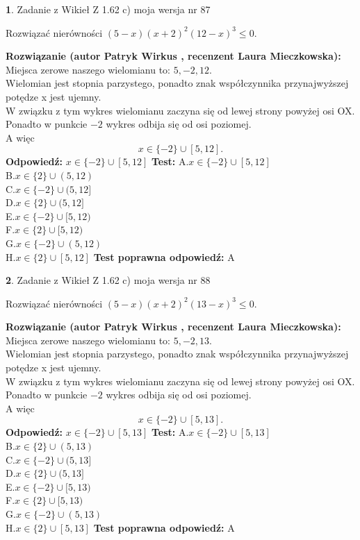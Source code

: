 \documentclass[12pt, a4paper]{article}
\theoremstyle{definition} %
\newtheorem{zad}{}
\newcommand{\zadStart}[1]{\begin{zad}#1\newline}
\newcommand{\zadStop}{\end{zad}}
\newcommand{\rozwStart}[2]{\noindent \textbf{Rozwiązanie (autor #1 , recenzent #2): }\newline}
\newcommand{\rozwStop}{\newline}
\newcommand{\odpStart}{\noindent \textbf{Odpowiedź:}\newline}
\newcommand{\odpStop}{\newline}
\newcommand{\testStart}{\noindent \textbf{Test:}\newline}
\newcommand{\testStop}{\newline}
\newcommand{\kluczStart}{\noindent \textbf{Test poprawna odpowiedź:}\newline}
\newcommand{\kluczStop}{\newline}
\begin{document}
\zadStart{Zadanie z Wikieł Z 1.62 c) moja wersja nr 87}

Rozwiązać nierówności $(5-x)(x+2)^{2}(12-x)^{3}\le0$.
\zadStop
\rozwStart{Patryk Wirkus}{Laura Mieczkowska}
Miejsca zerowe naszego wielomianu to: $5, -2, 12$.\\
Wielomian jest stopnia parzystego, ponadto znak współczynnika przy\linebreak najwyższej potędze x jest ujemny.\\ W związku z tym wykres wielomianu zaczyna się od lewej strony powyżej osi OX.\\
Ponadto w punkcie $-2$ wykres odbija się od osi poziomej.\\
A więc $$x \in \{-2\} \cup [5,12].$$
\rozwStop
\odpStart
$x \in \{-2\} \cup [5,12]$
\odpStop
\testStart
A.$x \in \{-2\} \cup [5,12]$\\
B.$x \in \{2\} \cup (5,12)$\\
C.$x \in \{-2\} \cup (5,12]$\\
D.$x \in \{2\} \cup (5,12]$\\
E.$x \in \{-2\} \cup [5,12)$\\
F.$x \in \{2\} \cup [5,12)$\\
G.$x \in \{-2\} \cup (5,12)$\\
H.$x \in \{2\} \cup [5,12]$
\testStop
\kluczStart
A
\kluczStop



\zadStart{Zadanie z Wikieł Z 1.62 c) moja wersja nr 88}

Rozwiązać nierówności $(5-x)(x+2)^{2}(13-x)^{3}\le0$.
\zadStop
\rozwStart{Patryk Wirkus}{Laura Mieczkowska}
Miejsca zerowe naszego wielomianu to: $5, -2, 13$.\\
Wielomian jest stopnia parzystego, ponadto znak współczynnika przy\linebreak najwyższej potędze x jest ujemny.\\ W związku z tym wykres wielomianu zaczyna się od lewej strony powyżej osi OX.\\
Ponadto w punkcie $-2$ wykres odbija się od osi poziomej.\\
A więc $$x \in \{-2\} \cup [5,13].$$
\rozwStop
\odpStart
$x \in \{-2\} \cup [5,13]$
\odpStop
\testStart
A.$x \in \{-2\} \cup [5,13]$\\
B.$x \in \{2\} \cup (5,13)$\\
C.$x \in \{-2\} \cup (5,13]$\\
D.$x \in \{2\} \cup (5,13]$\\
E.$x \in \{-2\} \cup [5,13)$\\
F.$x \in \{2\} \cup [5,13)$\\
G.$x \in \{-2\} \cup (5,13)$\\
H.$x \in \{2\} \cup [5,13]$
\testStop
\kluczStart
A
\kluczStop
\end{document}

